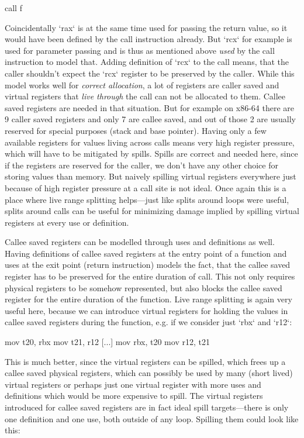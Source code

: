 \begtt
call f %
\endtt

Coincidentally `rax` is at the same time used for passing the return value, so
it would have been defined by the call instruction already. But `rcx` for
example is used for parameter passing and is thus as mentioned above {\em used}
by the call instruction to model that. Adding definition of `rcx` to the call
means, that the caller shouldn't expect the `rcx` register to be preserved by
the caller. While this model works well for {\em correct allocation}, a lot of
registers are caller saved and virtual registers that {\em live through} the
call can not be allocated to them. Callee saved registers are needed in that
situation. But for example on x86-64 there are 9 caller saved registers and only
7 are callee saved, and out of those 2 are usually reserved for special purposes
(stack and base pointer). Having only a few available registers for values
living across calls means very high register pressure, which will have to be
mitigated by spills. Spills are correct and needed here, since if the registers
are reserved for the caller, we don't have any other choice for storing values
than memory. But naively spilling virtual registers everywhere just because of
high register pressure at a call site is not ideal. Once again this is a place
where live range splitting helps---just like splits around loops were useful,
splits around calls can be useful for minimizing damage implied by spilling
virtual registers at every use or definition.

Callee saved registers can be modelled through uses and definitions as well.
Having definitions of callee saved registers at the entry point of a function
and uses at the exit point (return instruction) models the fact, that the callee
saved register has to be preserved for the entire duration of call. This not
only requires physical registers to be somehow represented, but also blocks the
callee saved register for the entire duration of the function. Live range
splitting is again very useful here, because we can introduce virtual registers
for holding the values in callee saved registers during the function, e.g. if we
consider just `rbx` and `r12`:

\begtt
mov t20, rbx
mov t21, r12
[...]
mov rbx, t20
mov r12, t21
\endtt

This is much better, since the virtual registers can be spilled, which frees up
a callee saved physical registers, which can possibly be used by many (short
lived) virtual registers or perhaps just one virtual register with more uses and
definitions which would be more expensive to spill. The virtual
registers introduced for callee saved registers are in fact ideal spill
targets---there is only one definition and one use, both outside of any loop.
Spilling them could look like this:

